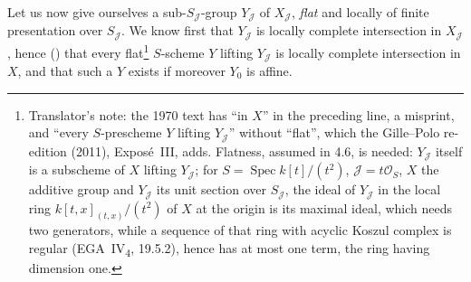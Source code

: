 Let us now give ourselves a sub-\(S_{\mathscr J}\)-group
\(Y_{\mathscr J}\) of \(X_{\mathscr J}\), \emph{flat} and locally of
finite presentation over \(S_{\mathscr J}\). We know first that
\(Y_{\mathscr J}\) is locally complete intersection in \(X_{\mathscr J}\), hence
() that every flat\footnote{Translator's note: the 1970 text has
``in \(X\)'' in the preceding line, a misprint, and ``every \(S\)-prescheme
\(Y\) lifting \(Y_{\mathscr J}\)'' without ``flat'', which the Gille--Polo
re-edition (2011), Exposé~III, adds. Flatness, assumed in 4.6, is needed:
\(Y_{\mathscr J}\) itself is a subscheme of \(X\) lifting \(Y_{\mathscr J}\);
for \(S=\operatorname{Spec}k[t]/(t^2)\), \(\mathscr J=t\mathscr O_S\), \(X\) the
additive group and \(Y_{\mathscr J}\) its unit section over \(S_{\mathscr J}\),
the ideal of \(Y_{\mathscr J}\) in the local ring \(k[t,x]_{(t,x)}/(t^2)\) of
\(X\) at the origin is its maximal ideal, which needs two generators, while a
sequence of that ring with acyclic Koszul complex is regular
(EGA~IV\textsubscript{4}, 19.5.2), hence has at most one term, the ring having
dimension one.} \(S\)-scheme \(Y\) lifting \(Y_{\mathscr J}\) is
locally complete intersection in \(X\), and that such a \(Y\) exists if
moreover \(Y_0\) is affine.


